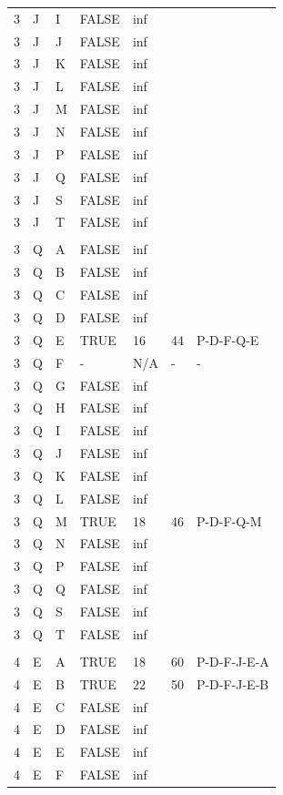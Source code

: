 \documentclass[11pt]{book}
\renewcommand{\=}[1]{\stackrel{#1}{=}} %
\theoremstyle{definition}
\theoremstyle{remark}
\begin{document}
\begin{longtable}{lllllll}
3 & J & I & FALSE & inf &  &  \\
3 & J & J & FALSE & inf &  &  \\
3 & J & K & FALSE & inf &  &  \\
3 & J & L & FALSE & inf &  &  \\
3 & J & M & FALSE & inf &  &  \\
3 & J & N & FALSE & inf &  &  \\
3 & J & P & FALSE & inf &  &  \\
3 & J & Q & FALSE & inf &  &  \\
3 & J & S & FALSE & inf &  &  \\
3 & J & T & FALSE & inf &  &  \\
 &  &  &  &  &  &  \\
3 & Q & A & FALSE & inf &  &  \\
3 & Q & B & FALSE & inf &  &  \\
3 & Q & C & FALSE & inf &  &  \\
3 & Q & D & FALSE & inf &  &  \\
3 & Q & E & TRUE & 16 & 44 & P-D-F-Q-E \\
3 & Q & F & - & N/A & - & - \\
3 & Q & G & FALSE & inf &  &  \\
3 & Q & H & FALSE & inf &  &  \\
3 & Q & I & FALSE & inf &  &  \\
3 & Q & J & FALSE & inf &  &  \\
3 & Q & K & FALSE & inf &  &  \\
3 & Q & L & FALSE & inf &  &  \\
3 & Q & M & TRUE & 18 & 46 & P-D-F-Q-M \\
3 & Q & N & FALSE & inf &  &  \\
3 & Q & P & FALSE & inf &  &  \\
3 & Q & Q & FALSE & inf &  &  \\
3 & Q & S & FALSE & inf &  &  \\
3 & Q & T & FALSE & inf &  &  \\
 &  &  &  &  &  &  \\
4 & E & A & TRUE & 18 & 60 & P-D-F-J-E-A \\
4 & E & B & TRUE & 22 & 50 & P-D-F-J-E-B \\
4 & E & C & FALSE & inf &  &  \\
4 & E & D & FALSE & inf &  &  \\
4 & E & E & FALSE & inf &  &  \\
4 & E & F & FALSE & inf &  &  \\

\end{longtable}
\end{document}

